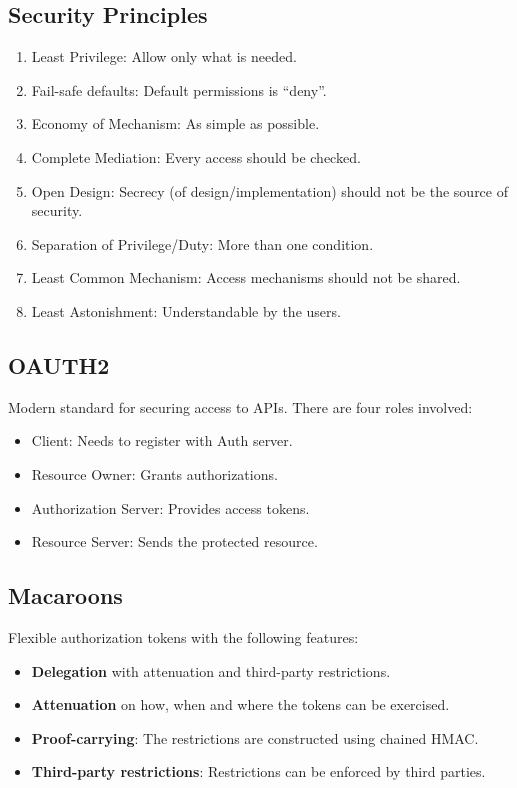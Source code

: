 \documentclass[a4paper]{article}
\begin{document}
\subsection{Security Principles}
\begin{enumerate}
    \item Least Privilege: Allow only what is needed.
    \item Fail-safe defaults: Default permissions is ``deny''.
    \item Economy of Mechanism: As simple as possible.
    \item Complete Mediation: Every access should be checked.
    \item Open Design: Secrecy (of design/implementation) should not be the source of security.
    \item Separation of Privilege/Duty: More than one condition.
    \item Least Common Mechanism: Access mechanisms should not be shared.
    \item Least Astonishment: Understandable by the users.
\end{enumerate}

\subsection{OAUTH2}
Modern standard for securing access to APIs. There are four roles involved:
\begin{itemize}
    \item Client: Needs to register with Auth server.
    \item Resource Owner: Grants authorizations.
    \item Authorization Server: Provides access tokens.
    \item Resource Server: Sends the protected resource.
\end{itemize}

\subsection{Macaroons}
Flexible authorization tokens with the following features:
\begin{itemize}
    \item \textbf{Delegation} with attenuation and third-party restrictions.
    \item \textbf{Attenuation} on how, when and where the tokens can be exercised.
    \item \textbf{Proof-carrying}: The restrictions are constructed using chained HMAC.
    \item \textbf{Third-party restrictions}: Restrictions can be enforced by third parties.
\end{itemize}
\end{document}
